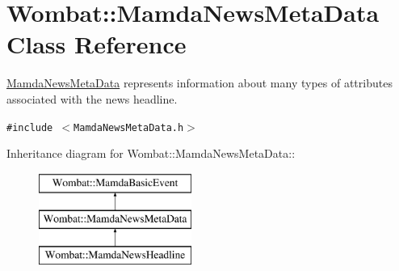 \hypertarget{classWombat_1_1MamdaNewsMetaData}{
\section{Wombat::Mamda\-News\-Meta\-Data Class Reference}
\label{classWombat_1_1MamdaNewsMetaData}
}
\hyperlink{classWombat_1_1MamdaNewsMetaData}{Mamda\-News\-Meta\-Data} represents information about many types of attributes associated with the news headline.  


{\tt \#include $<$Mamda\-News\-Meta\-Data.h$>$}

Inheritance diagram for Wombat::Mamda\-News\-Meta\-Data::\begin{figure}[H]
\begin{center}
\leavevmode
\includegraphics[height=3cm]{classWombat_1_1MamdaNewsMetaData}
\end{center}
\end{figure}
